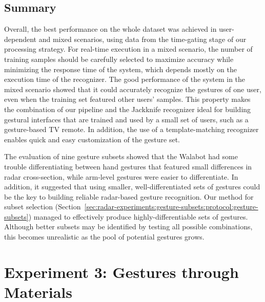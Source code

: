 \subsection{Summary} \label{sec:radar-experiments:gesture-subsets:discussion}
Overall, the best performance on the whole dataset was achieved in user-dependent and mixed scenarios, using data from the time-gating stage of our processing strategy. 
For real-time execution in a mixed scenario, the number of training samples should be carefully selected to maximize accuracy while minimizing the response time of the system, which depends mostly on the execution time of the recognizer. 
The good performance of the system in the mixed scenario showed that it could accurately recognize the gestures of one user, even when the training set featured other users' samples. 
This property makes the combination of our pipeline and the Jackknife recognizer ideal for building gestural interfaces that are trained and used by a small set of users, such as a gesture-based TV remote. 
In addition, the use of a template-matching recognizer enables quick and easy customization of the gesture set.

The evaluation of nine gesture subsets showed that the Walabot had some trouble differentiating between hand gestures that featured small differences in radar cross-section, while arm-level gestures were easier to differentiate.
%
In addition, it suggested that using smaller, well-differentiated sets of gestures could be the key to building reliable radar-based gesture recognition. 
%
Our method for subset selection (Section~\ref{sec:radar-experiments:gesture-subsets:protocol:gesture-subsets}) managed to effectively produce highly-differentiable sets of gestures. Although better subsets may be identified by testing all possible combinations, this becomes unrealistic as the pool of potential gestures grows.


\section{Experiment 3: Gestures through Materials} \label{sec:radar-experiments:through-materials}

